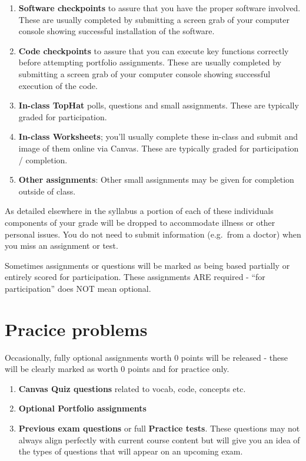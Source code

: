 \documentclass[
]{book}
\providecommand{\tightlist}{%
  \setlength{\itemsep}{0pt}\setlength{\parskip}{0pt}}
\begin{document}
\begin{enumerate}
\def\labelenumi{\arabic{enumi}.}
\tightlist
\item
  \textbf{Software checkpoints} to assure that you have the proper software involved. These are usually completed by submitting a screen grab of your computer console showing successful installation of the software.
\item
  \textbf{Code checkpoints} to assure that you can execute key functions correctly before attempting portfolio assignments. These are usually completed by submitting a screen grab of your computer console showing successful execution of the code.
\item
  \textbf{In-class TopHat} polls, questions and small assignments. These are typically graded for participation.
\item
  \textbf{In-class Worksheets}; you'll usually complete these in-class and submit and image of them online via Canvas. These are typically graded for participation / completion.
\item
  \textbf{Other assignments}: Other small assignments may be given for completion outside of class.
\end{enumerate}

As detailed elsewhere in the syllabus a portion of each of these individuals components of your grade will be dropped to accommodate illness or other personal issues. You do not need to submit information (e.g.~from a doctor) when you miss an assignment or test.

Sometimes assignments or questions will be marked as being based partially or entirely scored for participation. These assignments ARE required - ``for participation'' does NOT mean optional.

\hypertarget{pracice-problems}{%
\section{Pracice problems}\label{pracice-problems}}

Occasionally, fully optional assignments worth 0 points will be released - these will be clearly marked as worth 0 points and for practice only.

\begin{enumerate}
\def\labelenumi{\arabic{enumi}.}
\tightlist
\item
  \textbf{Canvas Quiz questions} related to vocab, code, concepts etc.
\item
  \textbf{Optional Portfolio assignments}
\item
  \textbf{Previous exam questions} or full \textbf{Practice tests}. These questions may not always align perfectly with current course content but will give you an idea of the types of questions that will appear on an upcoming exam.
\end{enumerate}
\end{document}
